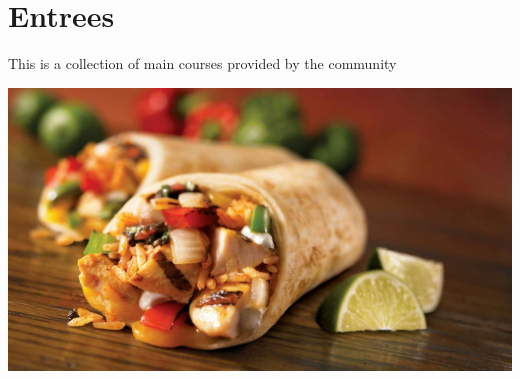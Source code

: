 \chapter{Entrees}

This is a collection of main courses provided by the community

\centering
\includegraphics{images/pexels-photo-461198.jpg}
